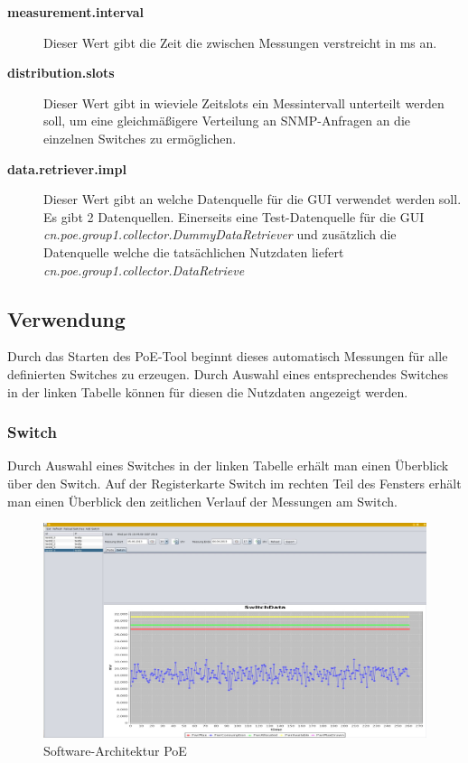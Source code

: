 \begin{description}
  \item [\textbf{measurement.interval}] Dieser Wert gibt die Zeit die zwischen
  Messungen verstreicht in ms an.
  \item [\textbf{distribution.slots}] Dieser Wert gibt in wieviele Zeitslots ein
  Messintervall unterteilt werden soll, um eine gleichmäßigere Verteilung an
  SNMP-Anfragen an die einzelnen Switches zu ermöglichen.
  \item [\textbf{data.retriever.impl}] Dieser Wert gibt an welche Datenquelle
  für die GUI verwendet werden soll. Es gibt 2 Datenquellen. Einerseits eine
  Test-Datenquelle für die GUI
  \textit{cn.poe.group1.collector.DummyDataRetriever} und zusätzlich die
  Datenquelle welche die tatsächlichen Nutzdaten liefert \textit{cn.poe.group1.collector.DataRetrieve}
\end{description}

\subsection{Verwendung}

Durch das Starten des PoE-Tool beginnt dieses automatisch Messungen für alle
definierten Switches zu erzeugen. Durch Auswahl eines entsprechendes Switches in
der linken Tabelle  können für diesen die Nutzdaten angezeigt werden.

\subsubsection{Switch}

Durch Auswahl eines Switches in der linken Tabelle erhält man einen Überblick
über den Switch. Auf der Registerkarte Switch im rechten Teil des Fensters
erhält man einen Überblick den zeitlichen Verlauf der Messungen am Switch.

\begin{figure}[h]
    \centering
    \leavevmode
    \includegraphics[width=1.0\linewidth]{figures/screenshot2.jpg}
    \caption{Software-Architektur PoE}
    \label{fig:Ports-PoE}
\end{figure}

